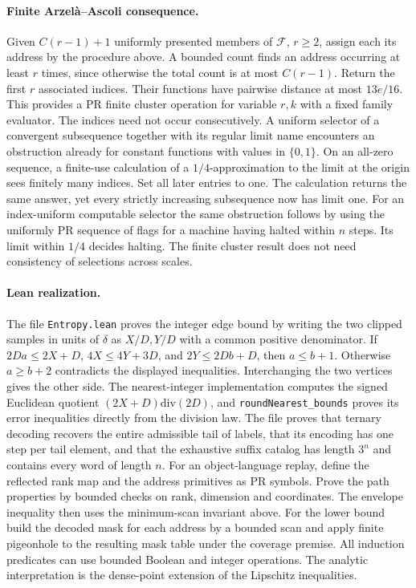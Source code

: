 \paragraph{Finite Arzelà--Ascoli consequence.}
Given $C(r-1)+1$ uniformly presented members of $\mathcal F$, $r\ge2$, assign each its address by the procedure above. A bounded count finds an address occurring at least $r$ times, since otherwise the total count is at most $C(r-1)$. Return the first $r$ associated indices. Their functions have pairwise distance at most $13e/16$. This provides a PR finite cluster operation for variable $r,k$ with a fixed family evaluator. The indices need not occur consecutively. A uniform selector of a convergent subsequence together with its regular limit name encounters an obstruction already for constant functions with values in $\{0,1\}$. On an all-zero sequence, a finite-use calculation of a $1/4$-approximation to the limit at the origin sees finitely many indices. Set all later entries to one. The calculation returns the same answer, yet every strictly increasing subsequence now has limit one. For an index-uniform computable selector the same obstruction follows by using the uniformly PR sequence of flags for a machine having halted within $n$ steps. Its limit within $1/4$ decides halting. The finite cluster result does not need consistency of selections across scales.

\paragraph{Lean realization.}
The file \texttt{Entropy.lean} proves the integer edge bound by writing the two clipped samples in units of $\delta$ as $X/D,Y/D$ with a common positive denominator. If $2Da\le2X+D$, $4X\le4Y+3D$, and $2Y\le2Db+D$, then $a\le b+1$. Otherwise $a\ge b+2$ contradicts the displayed inequalities. Interchanging the two vertices gives the other side. The nearest-integer implementation computes the signed Euclidean quotient $(2X+D)\mathbin{\mathrm{div}}(2D)$, and \texttt{roundNearest\_bounds} proves its error inequalities directly from the division law. The file proves that ternary decoding recovers the entire admissible tail of labels, that its encoding has one step per tail element, and that the exhaustive suffix catalog has length $3^n$ and contains every word of length $n$. For an object-language replay, define the reflected rank map and the address primitives as PR symbols. Prove the path properties by bounded checks on rank, dimension and coordinates. The envelope inequality then uses the minimum-scan invariant above. For the lower bound build the decoded mask for each address by a bounded scan and apply finite pigeonhole to the resulting mask table under the coverage premise. All induction predicates can use bounded Boolean and integer operations. The analytic interpretation is the dense-point extension of the Lipschitz inequalities.
